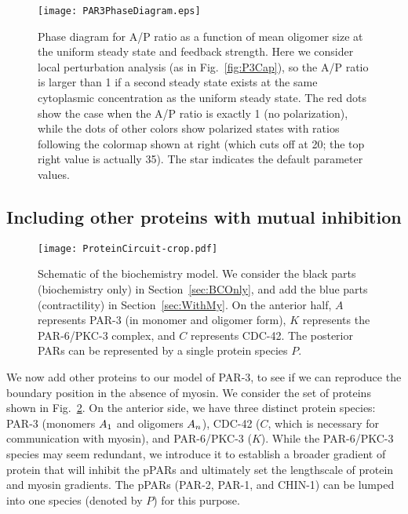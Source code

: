 \documentclass[11pt]{article}
\newcommand{\6}[1]{#1_{\text{6}}}
\newcommand{\3}[1]{#1_{\text{3}}}
\begin{document}
\begin{figure}
\centering
\texttt{[image: PAR3PhaseDiagram.eps]}
\caption{\label{fig:PhaseDiag} Phase diagram for A/P ratio as a function of mean oligomer size at the uniform steady state and feedback strength. Here we consider local perturbation analysis (as in Fig.\ \ref{fig:P3Cap}), so the A/P ratio is larger than 1 if a second steady state exists at the same cytoplasmic concentration as the uniform steady state. The red dots show the case when the A/P ratio is exactly 1 (no polarization), while the dots of other colors show polarized states with ratios following the colormap shown at right (which cuts off at 20; the top right value is actually 35). The star indicates the default parameter values.}
\end{figure}


\subsection{Including other proteins with mutual inhibition \label{sec:BCOnly}}
\begin{figure}
\centering
\texttt{[image: ProteinCircuit-crop.pdf]}
\caption{\label{fig:ModelSch}Schematic of the biochemistry model. We consider the black parts (biochemistry only) in Section\ \ref{sec:BCOnly}, and add the blue parts (contractility) in Section\ \ref{sec:WithMy}. On the anterior half, $A$ represents PAR-3 (in monomer and oligomer form), $K$ represents the PAR-6/PKC-3 complex, and $C$ represents CDC-42. The posterior PARs can be represented by a single protein species $P$.}
\end{figure}

We now add other proteins to our model of PAR-3, to see if we can reproduce the boundary position in the absence of myosin. We consider the set of proteins shown in Fig.\ \ref{fig:ModelSch}. On the anterior side, we have three distinct protein species: PAR-3 (monomers $A_1$ and oligomers $A_n$), CDC-42 ($C$, which is necessary for communication with myosin), and PAR-6/PKC-3 ($K$). While the PAR-6/PKC-3 species may seem redundant, we introduce it to establish a broader gradient of protein that will inhibit the pPARs and ultimately set the lengthscale of protein and myosin gradients. The pPARs (PAR-2, PAR-1, and CHIN-1) can be lumped into one species (denoted by $P$) for this purpose.
\end{document}
